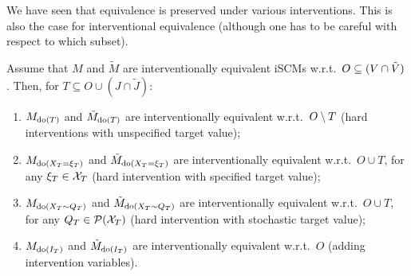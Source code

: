 We have seen that equivalence is preserved under various interventions. 
This is also the case for interventional equivalence (although one has to be careful with respect to which subset).
\begin{Prp}\label{prp:scm_interventions_preserve_interv_equiv}
  Assume that $M$ and $\tilde{M}$ are interventionally equivalent iSCMs w.r.t.\ $O \subseteq (V \cap \tilde{V})$. 
  Then, for $T \subseteq O \cup (J \cap \tilde{J})$:
    \begin{enumerate}
      \item $M_{\operatorname{do}(T)}$ and $\tilde{M}_{\operatorname{do}(T)}$ are interventionally equivalent w.r.t.\ $O \setminus T$ (hard interventions with unspecified target value);
      \item $M_{\operatorname{do}(X_T=\xi_T)}$ and $\tilde{M}_{\operatorname{do}(X_T=\xi_T)}$ are interventionally equivalent w.r.t.\ $O \cup T$, for any $\xi_T \in \mathcal{X}_T$ (hard intervention with specified target value);
      \item $M_{\operatorname{do}(X_T\sim Q_T)}$ and $\tilde{M}_{\operatorname{do}(X_T\sim Q_T)}$ are interventionally equivalent w.r.t.\ $O \cup T$, for any $Q_T \in \mathcal{P}(\mathcal{X}_T)$ (hard intervention with stochastic target value);
      \item $M_{\operatorname{do}(I_T)}$ and $\tilde{M}_{\operatorname{do}(I_T)}$ are interventionally equivalent w.r.t.\ $O$ (adding intervention variables).
    \end{enumerate}
\end{Prp}
